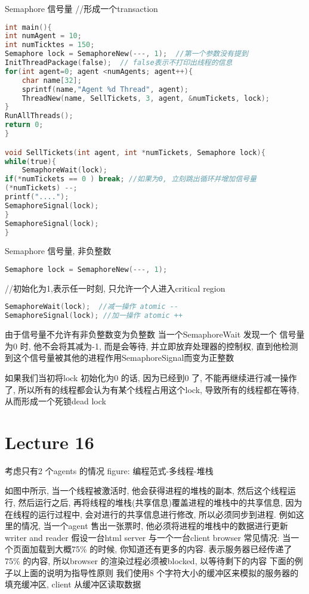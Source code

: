 \documentclass{article}
\begin{document}
Semaphore
信号量
//形成一个transaction
\begin{lstlisting}[language = C]
int main(){
int numAgent = 10;
int numTicktes = 150;
Semaphore lock = SemaphoreNew(---, 1);  //第一个参数没有提到
InitThreadPackage(false);  // false表示不打印出线程的信息
for(int agent=0; agent <numAgents; agent++){
	char name[32];
	sprintf(name,"Agent %d Thread", agent);
	ThreadNew(name, SellTickets, 3, agent, &numTickets, lock);
}
RunAllThreads();
return 0;
}

void SellTickets(int agent, int *numTickets, Semaphore lock){
while(true){
	SemaphoreWait(lock);
if(*numTickets == 0 ) break; //如果为0, 立刻跳出循环并增加信号量
(*numTickets) --;
printf("....");
SemaphoreSignal(lock);
}
SemaphoreSignal(lock);
}
\end{lstlisting}

Semaphore 信号量, 非负整数
\begin{lstlisting}[language = C]
Semaphore lock = SemaphoreNew(---, 1); 
\end{lstlisting}
//初始化为1,表示任一时刻, 只允许一个人进入critical region

\begin{lstlisting}[language = C]
SemaphoreWait(lock);  //减一操作 atomic --
SemaphoreSignal(lock); //加一操作 atomic ++
\end{lstlisting}
由于信号量不允许有非负整数变为负整数
当一个SemaphoreWait 发现一个 信号量为0 时, 他不会将其减为-1, 而是会等待, 并立即放弃处理器的控制权, 直到他检测到这个信号量被其他的进程作用SemaphoreSignal而变为正整数

如果我们当初将lock 初始化为0 的话, 因为已经到0 了, 不能再继续进行减一操作了, 所以所有的线程都会认为有某个线程占用这个lock, 导致所有的线程都在等待, 从而形成一个死锁dead lock

\section{Lecture 16}
考虑只有2 个agents 的情况
figure: 编程范式-多线程-堆栈
 
如图中所示, 当一个线程被激活时, 他会获得进程的堆栈的副本, 然后这个线程运行, 然后运行之后, 再将线程的堆栈(共享信息)覆盖进程的堆栈中的共享信息, 因为在线程的运行过程中, 会对进行的共享信息进行修改, 所以必须同步到进程.
例如这里的情况, 当一个agent 售出一张票时, 他必须将进程的堆栈中的数据进行更新
writer and reader
假设一台html server 与一个一台client browser
常见情况: 当一个页面加载到大概75\% 的时候, 你知道还有更多的内容. 表示服务器已经传递了75\% 的内容, 所以browser 的渲染过程必须被blocked, 以等待剩下的内容
下面的例子以上面的说明为指导性原则
我们使用8 个字符大小的缓冲区来模拟的服务器的填充缓冲区, client 从缓冲区读取数据
\end{document}
